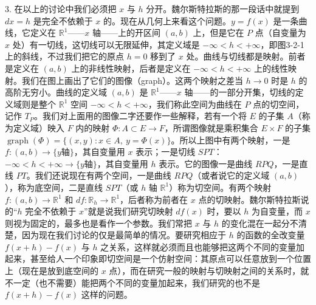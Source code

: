 3. 在以上的讨论中我们必须把 $x$ 与 $h$ 分开。魏尔斯特拉斯的那一段话中就提到 $dx=h$ 是完全不依赖于 $x$ 的。现在从几何上来看这个问题。$y=f(x)$ 是一条曲线，它定义在 $\mathbb R^1$——$x$ 轴——上的开区间 $(a,b)$ 上，但是它在 $P$ 点（自变量为 $x$ 处）有一切线，这切线可以无限延伸，其定义域是 $-\infty<h<+\infty$，即图3-2-1上的斜线，不过我们把它的原点 $h=0$ 移到了 $x$ 处。曲线与切线都是映射。前者是定义在 $(a,b)$ 上的非线性映射，后者是定义在 $-\infty<h<+\infty$ 上的线性映射。我们在图上画出了它们的图像（graph）。这两个映射之差当 $h\to0$ 时是 $h$ 的高阶无穷小。曲线的定义域 $(a,b)$ 是 $\mathbb R^1$——$x$ 轴——的一部分开集，切线的定义域则是整个 $\mathbb R^1$ 空间 $-\infty<h<+\infty$，我们称此空间为曲线在 $P$ 点的切空间，记作 $T_P$。我们对上面用的图像二字还要作一些解释，若有一个将 $E$ 的子集 $A$（称为定义域）映入 $F$ 内的映射 $\Phi:A\subset E\to F$，所谓图像就是乘积集合 $E\times F$ 的子集 $\operatorname{graph}(\Phi)=\{(x,y):x\in A,\ y=\Phi(x)\}$。所以上图中有两个映射，一是 $f:(a,b)\to\{y\text{轴}\}$，其自变量用 $x$ 表示；一是切线 $SPT$：$-\infty<h<+\infty\to\{y\text{轴}\}$，其自变量用 $h$ 表示。它的图像一是曲线 $RPQ$，一是直线 $PT$。我们还说现在有两个空间，一是曲线 $RPQ$（或者说它的定义域 $(a,b)$），称为底空间，二是直线 $SPT$（或 $h$ 轴 $\mathbb R^1$）称为切空间。有两个映射 $f:(a,b)\to\mathbb R^1$ 和 $df:\mathbb R_h\to\mathbb R^1$，后者称为前者在 $x$ 点的切映射。魏尔斯特拉斯说的“$h$ 完全不依赖于 $x$”就是说我们研究切映射 $df(x)$ 时，要以 $h$ 为自变量，而 $x$ 则视为固定的，最多也是看作一个参数。我们常把 $x$ 与 $h$ 的变化混在一起分不清楚，因为现在我们讨论的仅是最简单的情况。要研究相应于 $h$ 的函数的全改变量 $f(x+h)-f(x)$ 与 $h$ 之关系，这样就必须而且也能够把这两个不同的变量加起来，甚至给人一个印象即切空间是一个仿射空间：其原点可以任意放到一个位置上（现在是放到底空间的 $x$ 点），而在研究一般的映射与切映射之间的关系时，就不一定（也不需要）能把两个不同的变量加起来，我们研究的也不是 $f(x+h)-f(x)$ 这样的问题。

